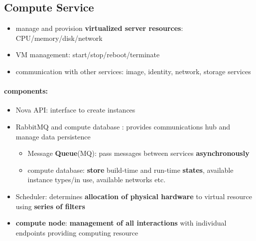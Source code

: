 \subsection{Compute Service}
\begin{itemize}
	\item manage and provision \textbf{virtualized server resources}: CPU/memory/disk/network
	\item VM management: start/stop/reboot/terminate
	\item communication with other services: image, identity, network, storage services
	
\end{itemize}

\paragraph{components:}
\begin{itemize}
	\item Nova API: interface to create instances
	\item RabbitMQ and compute database : provides communications hub and manage data persistence
	\begin{itemize}
		\item Message \textbf{Queue}(MQ): pass messages between services \textbf{asynchronously}
		\item compute database: \textbf{store} build-time and run-time \textbf{states}, available instance types/in use, available networks etc.
	\end{itemize}
	\item Scheduler: determines \textbf{allocation of physical hardware} to virtual resource using \textbf{series of filters}
	\item \textbf{compute node}: \textbf{management of all interactions} with individual endpoints providing computing resource
\end{itemize}

